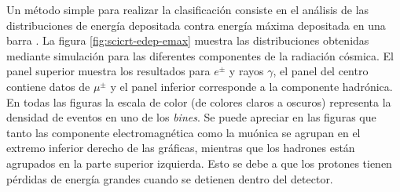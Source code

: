 Un método simple para realizar la clasificación consiste en el análisis de las distribuciones de energía depositada contra energía máxima depositada en una barra \cite{nagaiphd,sasaiphd}. La figura \ref{fig:scicrt-edep-emax} muestra las distribuciones obtenidas mediante simulación para las diferentes componentes de la radiación cósmica. El panel superior muestra los resultados para $e^{\pm}$ y rayos $\gamma$, el panel del centro contiene datos de $\mu^{\pm}$ y el panel inferior corresponde a la componente hadrónica. En todas las figuras la escala de color (de colores claros a oscuros) representa la densidad de eventos en uno de los \emph{bines}. Se puede apreciar en las figuras que tanto las componente electromagnética como la muónica se agrupan en el extremo inferior derecho de las gráficas, mientras que los hadrones están agrupados en la parte superior izquierda. Esto se debe a que los protones tienen pérdidas de energía grandes cuando se detienen dentro del detector.

